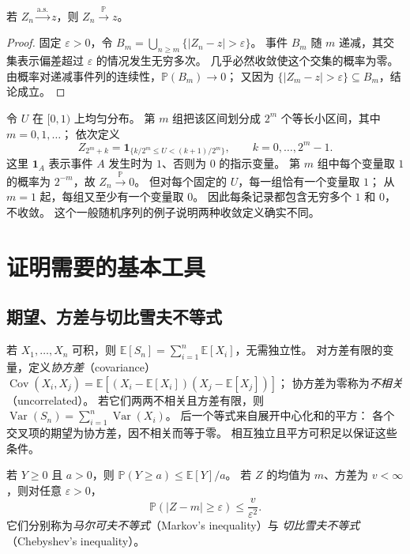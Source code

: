 \documentclass[UTF8,12pt,a4paper,fontset=fandol]{ctexart}
\begin{document}
\begin{proposition}[几乎必然收敛蕴含依概率收敛]
\label{prop:lln-as-implies-probability}
若 $Z_n\xrightarrow{\mathrm{a.s.}}z$，则 $Z_n\xrightarrow{\mathbb P}z$。
\end{proposition}

\begin{proof}
固定 $\varepsilon>0$，令
$B_m=\bigcup_{n\geq m}\{|Z_n-z|>\varepsilon\}$。
事件 $B_m$ 随 $m$ 递减，其交集表示偏差超过 $\varepsilon$ 的情况发生无穷多次。
几乎必然收敛使这个交集的概率为零。
由概率对递减事件列的连续性，$\mathbb P(B_m)\to0$；
又因为 $\{|Z_m-z|>\varepsilon\}\subseteq B_m$，结论成立。
\end{proof}

\begin{example}[依概率收敛不一定几乎必然收敛]
\label{ex:lln-typewriter}
令 $U$ 在 $[0,1)$ 上均匀分布。
第 $m$ 组把该区间划分成 $2^m$ 个等长小区间，其中 $m=0,1,\ldots$；
依次定义
\[
  Z_{2^m+k}
  =\mathbf1_{\{k/2^m\leq U<(k+1)/2^m\}},
  \qquad k=0,\ldots,2^m-1.
\]
这里 $\mathbf1_A$ 表示事件 $A$ 发生时为 $1$、否则为 $0$ 的指示变量。
第 $m$ 组中每个变量取 $1$ 的概率为 $2^{-m}$，故 $Z_n\xrightarrow{\mathbb P}0$。
但对每个固定的 $U$，每一组恰有一个变量取 $1$；
从 $m=1$ 起，每组又至少有一个变量取 $0$。
因此每条记录都包含无穷多个 $1$ 和 $0$，不收敛。
这个一般随机序列的例子说明两种收敛定义确实不同。
\end{example}

\section{证明需要的基本工具}
\label{sec:lln-basic-tools}

\subsection{期望、方差与切比雪夫不等式}

若 $X_1,\ldots,X_n$ 可积，则
$\mathbb E[S_n]=\sum_{i=1}^n\mathbb E[X_i]$，无需独立性。
对方差有限的变量，定义\emph{协方差}（covariance）
$\operatorname{Cov}(X_i,X_j)
=\mathbb E[(X_i-\mathbb E[X_i])(X_j-\mathbb E[X_j])]$；
协方差为零称为\emph{不相关}（uncorrelated）。
若它们两两不相关且方差有限，则
$\operatorname{Var}(S_n)=\sum_{i=1}^n\operatorname{Var}(X_i)$。
后一个等式来自展开中心化和的平方：
各个交叉项的期望为协方差，因不相关而等于零。
相互独立且平方可积足以保证这些条件。

\begin{lemma}[马尔可夫与切比雪夫不等式]
\label{lem:lln-chebyshev}
若 $Y\geq0$ 且 $a>0$，则
$\mathbb P(Y\geq a)\leq\mathbb E[Y]/a$。
若 $Z$ 的均值为 $m$、方差为 $v<\infty$，则对任意 $\varepsilon>0$，
\begin{equation}
  \mathbb P(|Z-m|\geq\varepsilon)\leq\frac{v}{\varepsilon^2}.
  \label{eq:lln-chebyshev}
\end{equation}
它们分别称为\emph{马尔可夫不等式}（Markov's inequality）与
\emph{切比雪夫不等式}（Chebyshev's inequality）。
\end{lemma}
\end{document}
